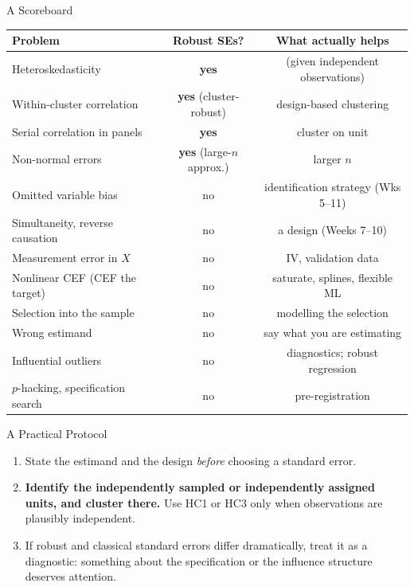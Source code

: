 \documentclass[aspectratio=169,11pt,xcolor=dvipsnames]{beamer}
\newcommand{\core}{\,\raisebox{0.6pt}{\textcolor{corestar}{$\bigstar$}}}
\begin{document}
\begin{frame}{A Scoreboard\core}
\vskip-4pt
\begin{center}\footnotesize
\renewcommand{\arraystretch}{1.1}
\begin{tabular}{lcc}
\toprule
Problem & Robust SEs? & What actually helps \\
\midrule
Heteroskedasticity & \textbf{yes} & (given independent observations) \\
Within-cluster correlation & \textbf{yes} (cluster-robust) & design-based clustering \\
Serial correlation in panels & \textbf{yes} & cluster on unit \\
Non-normal errors & \textbf{yes} (large-$n$ approx.) & larger $n$ \\
\midrule
Omitted variable bias & \alert{no} & identification strategy (Wks 5--11) \\
Simultaneity, reverse causation & \alert{no} & a design (Weeks 7--10) \\
Measurement error in $X$ & \alert{no} & IV, validation data \\
Nonlinear CEF (CEF the target) & \alert{no} & saturate, splines, flexible ML \\
Selection into the sample & \alert{no} & modelling the selection \\
Wrong estimand & \alert{no} & say what you are estimating \\
Influential outliers & \alert{no} & diagnostics; robust regression \\
$p$-hacking, specification search & \alert{no} & pre-registration \\
\bottomrule
\end{tabular}
\end{center}
\end{frame}

\begin{frame}{A Practical Protocol\core}
\begin{enumerate}\itemsep4pt
  \item State the estimand and the design \emph{before} choosing a standard error.
  \item \textbf{Identify the independently sampled or independently assigned
        units, and cluster there.} Use HC1 or HC3 only when observations are
        plausibly independent.
  \item If robust and classical standard errors differ dramatically, treat it as a
        diagnostic: something about the specification or the influence structure
        deserves attention.
\end{enumerate}
\end{frame}
\end{document}
